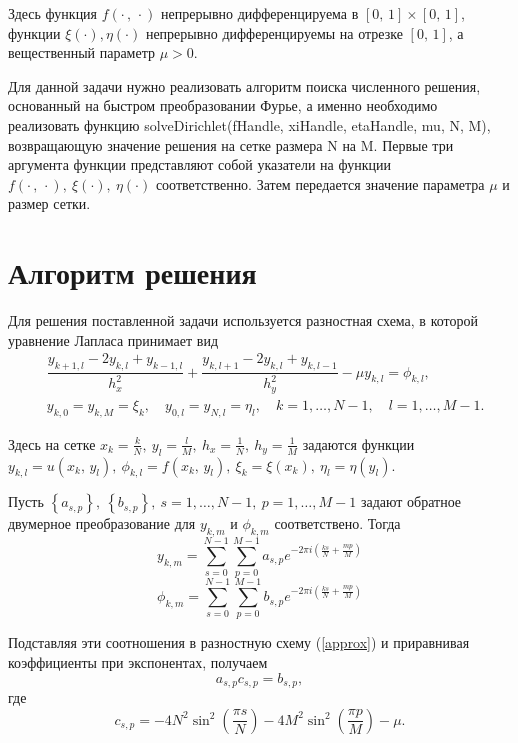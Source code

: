 \documentclass[11pt]{article}
\begin{document}
Здесь функция $f\left(\cdot\, , \, \cdot\right)$ непрерывно дифференцируема в $\left[0, \, 1\right]
\times \left[0, \, 1\right]$, функции $\xi\left(\cdot\right), \eta\left(\cdot\right)$ 
непрерывно дифференцируемы на отрезке $\left[0, \, 1\right]$, а вещественный параметр $\mu > 0$.

Для данной задачи нужно реализовать алгоритм поиска численного решения, основанный
на быстром преобразовании Фурье, а именно необходимо реализовать функцию 
solveDirichlet(fHandle, xiHandle, etaHandle, mu, N, M), возвращающую значение решения на сетке размера N на M.
Первые три аргумента функции представляют собой указатели на функции $f\left(\cdot\, , \, \cdot\right), \ \xi\left(\cdot\right), \ \eta\left(\cdot\right)$ соответственно. Затем
передается значение параметра $\mu$ и размер сетки.

\newpage
\section{Алгоритм решения}
Для решения поставленной задачи используется разностная схема, в которой уравнение 
Лапласа принимает вид
\begin{equation} 
\begin{split}
&\dfrac{y_{k+1,l}-2y_{k,l}+y_{k-1,l}}{h_x^2} + 
\dfrac{y_{k,l+1}-2y_{k,l}+y_{k,l-1}}{h_y^2} - \mu y_{k,l} = \phi_{k,l}, \\ \label{approx}
&y_{k,0} = y_{k,M} = \xi_k, \quad y_{0,l} = y_{N,l} = \eta_l, \quad k = 1,\ldots,N-1, \quad l = 1,\ldots,M-1.
\end{split}
\end{equation}

Здесь на сетке $x_k = \frac{k}{N},\ y_l = \frac{l}{M},\ h_x=\frac{1}{N}, \ h_y=\frac{1}{M}$ задаются функции \\
$y_{k,l} = u\left(x_k, \, y_l\right),\ \phi_{k,l} = f\left(x_k, \, y_l\right), \
\xi_k = \xi\left(x_k\right),\ \eta_l = \eta\left(y_l\right).$

Пусть $\left\{a_{s,p}\right\}, \ \left\{b_{s,p}\right\}, \ s = 1,\ldots,N-1, \ p = 1,\ldots,M-1$ задают обратное двумерное преобразование для $y_{k,m}$ и $\phi_{k,m}$ соответствено. Тогда 
$$ y_{k,m}=\sum_{s=0}^{N-1}\sum_{p=0}^{M-1}a_{s,p}e^{-2\pi i \left(\frac{ks}{N} + \frac{mp}{M}\right)}$$
$$ \phi_{k,m}=\sum_{s=0}^{N-1}\sum_{p=0}^{M-1}b_{s,p}e^{-2\pi i \left(\frac{ks}{N} + \frac{mp}{M}\right)}$$

Подставляя эти соотношения в разностную схему (\ref{approx}) и приравнивая коэффициенты при экспонентах, получаем
\begin{equation}
a_{s,p}c_{s,p}= b_{s,p}, \label{ac=b}
\end{equation}
где $$c_{s,p} = -4N^2\sin^2\left(\frac{\pi s}{N}\right)-4M^2\sin^2\left(\frac{\pi p}{M}\right) - \mu.$$
\end{document}
